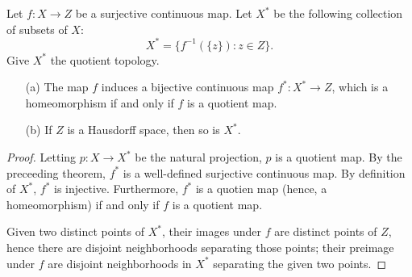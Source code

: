 \begin{cor}
    Let $f: X\rightarrow Z$ be a surjective continuous map.
    Let $X^*$ be the following collection of subsets of $X$:
    \begin{equation*}
        X^*=\{f^{-1}(\{z\}): z\in Z\}.
    \end{equation*}
    Give $X^*$ the quotient topology.
    \begin{enumerate}
        \item[(a)]
        {
            The map $f$ induces a bijective continuous map $f^*: X^*\rightarrow Z$, which is a homeomorphism if and only if $f$ is a quotient map.
        }
        \item[(b)]
        {
            If $Z$ is a Hausdorff space, then so is $X^*$.
        }
    \end{enumerate}
\end{cor}
\begin{proof}
    Letting $p: X\rightarrow X^*$ be the natural projection, $p$ is a quotient map.
    By the preceeding theorem, $f^*$ is a well-defined surjective continuous map.
    By definition of $X^*$, $f^*$ is injective.
    Furthermore, $f^*$ is a quotien map (hence, a homeomorphism) if and only if $f$ is a quotient map.

    Given two distinct points of $X^*$, their images under $f$ are distinct points of $Z$, hence there are disjoint neighborhoods separating those points; their preimage under $f$ are disjoint neighborhoods in $X^*$ separating the given two points.
\end{proof}
